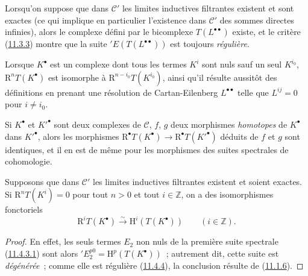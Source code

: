 \begin{env}[11.4.3]
Lorsqu'on suppose que dans $\mathcal C'$ les limites inductives filtrantes
existent et sont exactes (ce qui implique en particulier l'existence dans
$\mathcal C'$ des sommes directes infinies), alors le complexe défini par le
bicomplexe $T(L^{\bullet\bullet})$ existe, et le critère
(\hyperref[0.11.3.3-fr]{11.3.3}) montre que la suite
$'E(T(L^{\bullet\bullet}))$ est toujours \emph{régulière}.

Lorsque $K^\bullet$ est un complexe dont tous les termes $K^i$ sont nuls sauf
un seul $K^{i_0}$, $\mathrm R^nT(K^\bullet)$ est isomorphe à
$\mathrm R^{n-i_0}T(K^{i_0})$, ainsi qu'il résulte aussitôt des définitions en
prenant une résolution de Cartan-Eilenberg $L^{\bullet\bullet}$ telle que
$L^{ij}=0$ pour $i\neq i_0$.

Si $K^\bullet$ et $K'^\bullet$ sont deux complexes de $\mathcal C$, $f$, $g$
deux morphismes \emph{homotopes} de $K^\bullet$ dans $K'^\bullet$, alors les
morphismes $\mathrm R^\bullet T(K^\bullet)\to
\mathrm R^\bullet T(K'^\bullet)$ déduits de $f$ et $g$ sont identiques, et il
en est de même pour les morphismes des suites spectrales de cohomologie.
\end{env}

\begin{proposition}[11.4.5]
\label{0.11.4.5-fr}
Supposons que dans $\mathcal C'$ les limites inductives filtrantes existent et
soient exactes. Si $\mathrm R^nT(K^i)=0$ pour tout $n>0$ et tout
$i\in\mathbb Z$, on a des isomorphismes fonctoriels
\[
  \label{0.11.4.5.1-fr}
  \mathrm R^iT(K^\bullet)\xrightarrow{\sim}
  \mathrm H^i(T(K^\bullet))\qquad(i\in\mathbb Z).
  \tag{11.4.5.1}
\]
\end{proposition}

\begin{proof}
En effet, les seuls termes $E_2$ non nuls de la première suite spectrale
(\hyperref[0.11.4.3.1-fr]{11.4.3.1}) sont alors
$'E_2^{p0}=\mathrm H^p(T(K^\bullet))$~; autrement dit, cette suite est
\emph{dégénérée}~; comme elle est régulière
(\hyperref[0.11.4.4-fr]{11.4.4}), la conclusion résulte de
(\hyperref[0.11.1.6-fr]{11.1.6}).
\end{proof}

